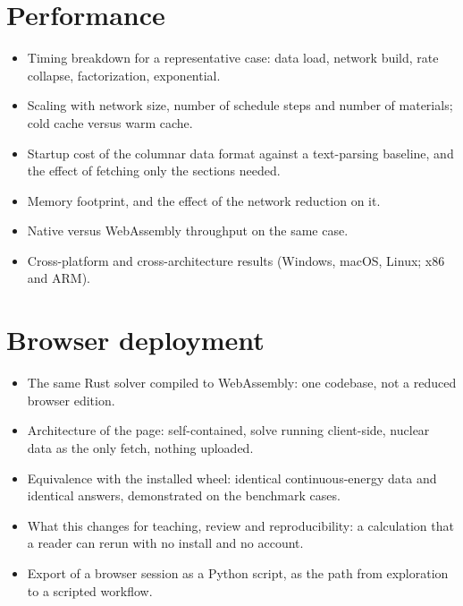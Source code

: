 \section{Performance}
\begin{itemize}
  \item Timing breakdown for a representative case: data load, network
        build, rate collapse, factorization, exponential.
  \item Scaling with network size, number of schedule steps and number of
        materials; cold cache versus warm cache.
  \item Startup cost of the columnar data format against a text-parsing
        baseline, and the effect of fetching only the sections needed.
  \item Memory footprint, and the effect of the network reduction on it.
  \item Native versus WebAssembly throughput on the same case.
  \item Cross-platform and cross-architecture results (Windows, macOS,
        Linux; x86 and ARM).
\end{itemize}

\section{Browser deployment}
\begin{itemize}
  \item The same Rust solver compiled to WebAssembly: one codebase, not a
        reduced browser edition.
  \item Architecture of the page: self-contained, solve running
        client-side, nuclear data as the only fetch, nothing uploaded.
  \item Equivalence with the installed wheel: identical continuous-energy
        data and identical answers, demonstrated on the benchmark cases.
  \item What this changes for teaching, review and reproducibility: a
        calculation that a reader can rerun with no install and no account.
  \item Export of a browser session as a Python script, as the path from
        exploration to a scripted workflow.
\end{itemize}

